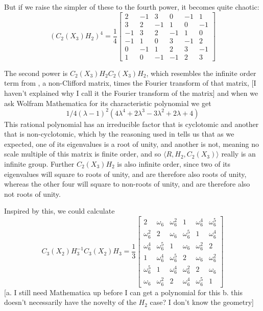 But if we raise the simpler of these to the fourth power, it becomes quite chaotic:
\[\left(C_2(X_3)H_2\right)^4 =
\frac{1}{4}
\begin{bmatrix}
	2&-1&3&0&-1&1\\ 
	3&2&-1&1&0&-1\\ 
	-1&3&2&-1&1&0\\ 
	-1&1&0&3&-1&2\\ 
	0&-1&1&2&3&-1\\ 
	1&0&-1&-1&2&3
\end{bmatrix}
\]

The second power is $C_2(X_3)H_2C_2(X_3)H_2$, which resembles the infinite order term from \cite{universal-qubit}, a non-Clifford matrix, times the Fourier transform of that matrix, [I haven't explained why I call it the Fourier transform of the matrix] and when we ask Wolfram Mathematica for its characteristic polynomial we get
\[1/4 (\lambda - 1)^2 (4 \lambda^4 + 2 \lambda^3 - 3 \lambda^2 + 2 \lambda + 4)\]
This rational polynomial has an irreducible factor that is cyclotomic and another that is non-cyclotomic, which by the reasoning used in \cite{universal-qubit} tells us that as we expected, one of its eigenvalues is a root of unity, and another is not, meaning no scale multiple of this matrix is finite order, and so $\langle R, H_2, C_2(X_3) \rangle$ really is an infinite group. Further $C_2(X_3)H_2$ is also infinite order, since two of its eigenvalues will square to roots of unity, and are therefore also roots of unity, whereas the other four will square to non-roots of unity, and are therefore also not roots of unity.

Inspired by this, we could calculate
\[C_3(X_2) H_3^{-1} C_3(X_2) H_3 =
\frac{1}{3} \begin{bmatrix}
2 & \omega_6 & \omega_6^2 & 1 & \omega_6^4 & \omega_6^5 \\
\omega_6^2 & 2 & \omega_6 & \omega_6^5 & 1 & \omega_6^4 \\
\omega_6^4 & \omega_6^5 & 1 & \omega_6 & \omega_6^2 & 2 \\
1 & \omega_6^4 & \omega_6^5 & 2 & \omega_6 & \omega_6^2 \\
\omega_6^5 & 1 & \omega_6^4 & \omega_6^2 & 2 & \omega_6 \\
\omega_6 & \omega_6^2 & 2 & \omega_6^4 & \omega_6^5 & 1
\end{bmatrix}
\]
[a. I still need Mathematica up before I can get a polynomial for this b. this doesn't necessarily have the novelty of the $H_2$ case? I don't know the geometry]

